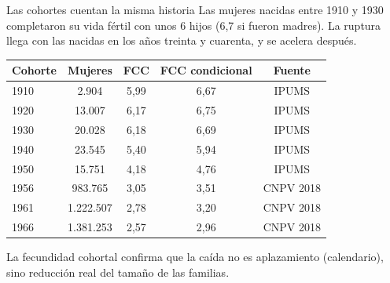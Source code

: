 \documentclass[11pt,aspectratio=169]{beamer}
\begin{document}
\begin{frame}{Las cohortes cuentan la misma historia}
Las mujeres nacidas entre 1910 y 1930 completaron su vida f\'ertil con
unos \alert{6 hijos} (6{,}7 si fueron madres). La ruptura llega con las
nacidas en los a\~nos treinta y cuarenta, y se acelera despu\'es.
\bigskip
\begin{center}
\begin{tabular}{lcccc}
\toprule
Cohorte & Mujeres & FCC & FCC condicional & Fuente \\
\midrule
1910 & 2.904 & 5{,}99 & 6{,}67 & IPUMS \\
1920 & 13.007 & 6{,}17 & 6{,}75 & IPUMS \\
1930 & 20.028 & 6{,}18 & 6{,}69 & IPUMS \\
1940 & 23.545 & 5{,}40 & 5{,}94 & IPUMS \\
1950 & 15.751 & 4{,}18 & 4{,}76 & IPUMS \\
1956 & 983.765 & 3{,}05 & 3{,}51 & CNPV 2018 \\
1961 & 1.222.507 & 2{,}78 & 3{,}20 & CNPV 2018 \\
1966 & 1.381.253 & 2{,}57 & 2{,}96 & CNPV 2018 \\
\bottomrule
\end{tabular}
\end{center}
\medskip
La fecundidad cohortal confirma que la ca\'ida no es aplazamiento
(calendario), sino \alert{reducci\'on real del tama\~no de las familias}.
\end{frame}
\end{document}
